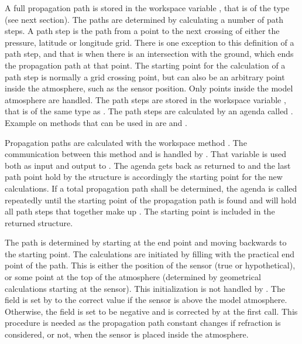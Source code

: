 A full propagation path is stored in the workspace variable
, that is of the type  (see next
section). The paths are determined by calculating a number of path
steps. A path step is the path from a point to the next crossing
of either the pressure, latitude or longitude grid. There is one
exception to this definition of a path step, and that is when there
is an intersection with the ground, which ends the propagation
path at that point. The starting point for the calculation of a path
step is normally a grid crossing point, but can also be an arbitrary
point inside the atmosphere, such as the sensor position. Only points
inside the model atmosphere are handled. The path steps are stored in
the workspace variable , that is of the same
type as . The path steps are calculated by an agenda
called . Example on methods that can
be used in  are
 and
.

Propagation paths are calculated with the workspace method
. The communication between this method and
 is handled by .
That variable is used both as input and output to
.  The agenda gets back
 as returned to  and the
last path point hold by the structure is accordingly the starting
point for the new calculations. If a total propagation path shall be
determined, the agenda is called repeatedly until the starting point
of the propagation path is found and  will hold
all path steps that together make up . The starting
point is included in the returned structure.

The path is determined by starting at the end point and moving
backwards to the starting point. The calculations are initiated by
filling  with the practical end point of the
path. This is either the position of the sensor (true or
hypothetical), or some point at the top of the atmosphere (determined
by geometrical calculations starting at the sensor). This
initialization is not handled by . 
The field  is set by 
to the correct value if the sensor is above the model atmosphere.
Otherwise, the field is set to be negative and is corrected by
 at the first call. This procedure is
needed as the propagation path constant changes if refraction is
considered, or not, when the sensor is placed inside the atmosphere.

